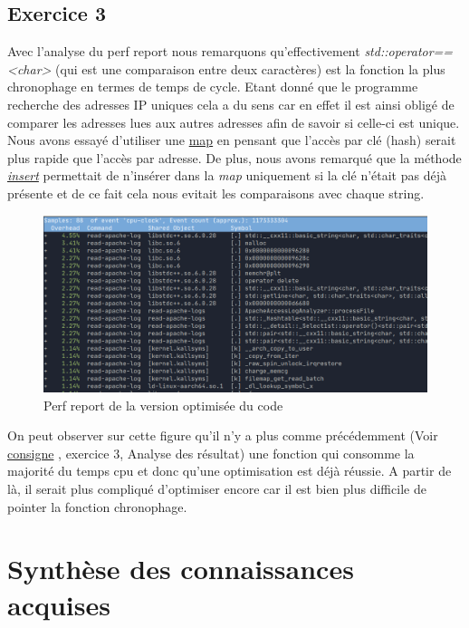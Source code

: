 \documentclass{ReportTemplate}
\begin{document}
\subsection{Exercice 3}
Avec l'analyse du perf report nous remarquons qu'effectivement
\textit{std::operator==<char>} (qui est une comparaison entre deux caractères)
est la fonction la plus chronophage en termes de temps de cycle. Etant donné que
le programme recherche des adresses IP uniques cela a du sens car en effet il
est ainsi obligé de comparer les adresses lues aux autres adresses afin de savoir
si celle-ci est unique. \newline
Nous avons essayé d'utiliser une
\href{https://m.cplusplus.com/reference/map/map/}{map} en pensant que l'accès
par clé (hash) serait plus rapide que l'accès par adresse. De plus, nous avons remarqué que la méthode
\href{https://m.cplusplus.com/reference/map/map/insert/}{\textit{insert}}
permettait de n'insérer dans la \textit{map} uniquement si la clé n'était pas
déjà présente et de ce fait cela nous evitait les comparaisons avec chaque
string.
\begin{figure}[H]
    \centering
    \includegraphics[width=\textwidth]{imageSources/Perf_Record_Optimised.png}
    \caption{Perf report de la version optimisée du code}
    \label{fig:PerfReportOptim}
\end{figure}
On peut observer sur cette figure qu'il n'y a plus comme précédemment (Voir
\href{https://mse-csel.github.io/website/optimisations/performances/perf-tp/}{consigne}
, exercice 3, Analyse des résultat) une
fonction qui consomme la majorité du temps cpu et donc qu'une optimisation est
déjà réussie. A partir de là, il serait plus compliqué d'optimiser encore car il
est bien plus difficile de pointer la fonction chronophage.
\section{Synthèse des connaissances acquises}
\end{document}
